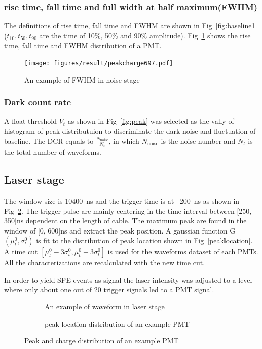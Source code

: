 \subsubsection{rise time, fall time and full width at half maximum(FWHM)}
The definitions of rise time, fall time and FWHM are shown in Fig~\ref{fig:baseline1} ($t_{10}, t_{50}, t_{90}$ are the time of 10\%, 50\% and 90\% amplitude). Fig~\ref{fig:risefallFWHM} shows the rise time, fall time and FWHM distribution of a PMT.
\begin{figure}
    \texttt{[image: figures/result/peakcharge697.pdf]}
    \caption{An example of FWHM in noise stage}
    \label{fig:risefallFWHM}
\end{figure}
\subsubsection{Dark count rate}
A float threshold $V_{t}$ as shown in Fig~\ref{fig:peak} was selected as the vally of histogram of peak distributuion to discriminate the dark noise and fluctuation of baseline. The DCR equals to $\frac{N_{\mathrm{noise}}}{N_{t}}$, in which $N_{\mathrm{noise}}$ is the noise number and $N_{t}$ is the total number of waveforms.

\subsection{Laser stage}
The window size is \SI{10400}{ns} and the trigger time is at ~\SI{200}{ns} as shown in Fig~\ref{fig:triggerwaveform}. The trigger pulse are mainly centering in the time interval between [250, 350]ns dependent on the length of cable. The maximum peak are found in the window of [0, 600]ns and extract the peak position. A gaussian function G$(\mu_t^0,\sigma_t^0)$ is fit to the distribution of peak location shown in Fig~\ref{peaklocation}. A time cut $[\mu_t^0-3\sigma_t^0, \mu_t^0+3\sigma_t^0]$ is used for the waveforms dataset of each PMTs. All the characterizations are recalculated with the new time cut.

In order to yield SPE events as signal the laser intensity was adjusted to a level where only
about one out of 20 trigger signals led to a PMT signal.

\begin{figure}
    \centering
    \begin{subfigure}[b]{0.35\textwidth}
        \caption{An example of waveform in laser stage}
        \label{fig:triggerwaveform}
    \end{subfigure}
    \begin{subfigure}[b]{0.35\textwidth}
        \caption{peak location distribution of an example PMT}%
        \label{fig:peaklocation}
    \end{subfigure}
    \caption{Peak and charge distribution of an example PMT}
\end{figure}
